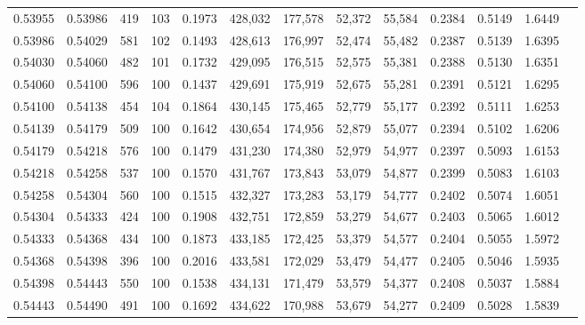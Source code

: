 \begin{tabular}{rrrrrrrrrrrrr}
0.53955 & 0.53986 &   419 & 103 &                                     0.1973 & 428,032 & 177,578 &  52,372 &  55,584 & 0.2384 & 0.5149 & 1.6449 \\
0.53986 & 0.54029 &   581 & 102 &                                     0.1493 & 428,613 & 176,997 &  52,474 &  55,482 & 0.2387 & 0.5139 & 1.6395 \\
0.54030 & 0.54060 &   482 & 101 &                                     0.1732 & 429,095 & 176,515 &  52,575 &  55,381 & 0.2388 & 0.5130 & 1.6351 \\
0.54060 & 0.54100 &   596 & 100 &                                     0.1437 & 429,691 & 175,919 &  52,675 &  55,281 & 0.2391 & 0.5121 & 1.6295 \\
0.54100 & 0.54138 &   454 & 104 &                                     0.1864 & 430,145 & 175,465 &  52,779 &  55,177 & 0.2392 & 0.5111 & 1.6253 \\
0.54139 & 0.54179 &   509 & 100 &                                     0.1642 & 430,654 & 174,956 &  52,879 &  55,077 & 0.2394 & 0.5102 & 1.6206 \\
0.54179 & 0.54218 &   576 & 100 &                                     0.1479 & 431,230 & 174,380 &  52,979 &  54,977 & 0.2397 & 0.5093 & 1.6153 \\
0.54218 & 0.54258 &   537 & 100 &                                     0.1570 & 431,767 & 173,843 &  53,079 &  54,877 & 0.2399 & 0.5083 & 1.6103 \\
0.54258 & 0.54304 &   560 & 100 &                                     0.1515 & 432,327 & 173,283 &  53,179 &  54,777 & 0.2402 & 0.5074 & 1.6051 \\
0.54304 & 0.54333 &   424 & 100 &                                     0.1908 & 432,751 & 172,859 &  53,279 &  54,677 & 0.2403 & 0.5065 & 1.6012 \\
0.54333 & 0.54368 &   434 & 100 &                                     0.1873 & 433,185 & 172,425 &  53,379 &  54,577 & 0.2404 & 0.5055 & 1.5972 \\
0.54368 & 0.54398 &   396 & 100 &                                     0.2016 & 433,581 & 172,029 &  53,479 &  54,477 & 0.2405 & 0.5046 & 1.5935 \\
0.54398 & 0.54443 &   550 & 100 &                                     0.1538 & 434,131 & 171,479 &  53,579 &  54,377 & 0.2408 & 0.5037 & 1.5884 \\
0.54443 & 0.54490 &   491 & 100 &                                     0.1692 & 434,622 & 170,988 &  53,679 &  54,277 & 0.2409 & 0.5028 & 1.5839 \\

\end{tabular}
